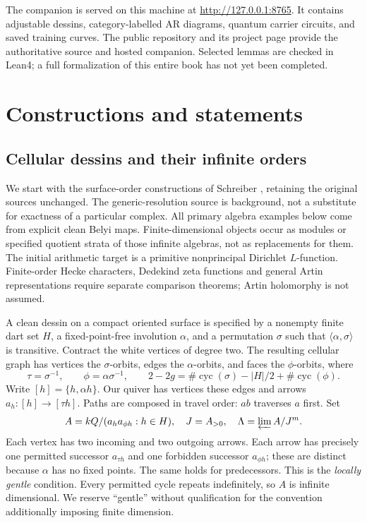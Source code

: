 \documentclass[11pt,oneside,openany]{book}
\theoremstyle{definition}\newtheorem{definition}[theorem]{Definition}
\theoremstyle{remark}\newtheorem{remark}[theorem]{Remark}
\begin{document}
The companion is served on this machine at \url{http://127.0.0.1:8765}. It contains adjustable dessins, category-labelled AR diagrams, quantum carrier circuits, and saved training curves. The public repository and its project page provide the authoritative source and hosted companion. Selected lemmas are checked in Lean4; a full formalization of this entire book has not yet been completed.
{\small\let\savedaddvspace\addvspace\renewcommand{\addvspace}[1]{\savedaddvspace{.6em}}\tableofcontents}
\mainmatter

\part{Constructions and statements}

\chapter{Cellular dessins and their infinite orders}
We start with the surface-order constructions of Schreiber \cite{SurfaceOrders,SurfaceDuality}, retaining the original sources unchanged. The generic-resolution source \cite{Persistence} is background, not a substitute for exactness of a particular complex. All primary algebra examples below come from explicit clean Belyi maps. Finite-dimensional objects occur as modules or specified quotient strata of those infinite algebras, not as replacements for them. The initial arithmetic target is a primitive nonprincipal Dirichlet $L$-function. Finite-order Hecke characters, Dedekind zeta functions and general Artin representations require separate comparison theorems; Artin holomorphy is not assumed.

A clean dessin on a compact oriented surface is specified by a nonempty finite dart set $H$, a fixed-point-free involution $\alpha$, and a permutation $\sigma$ such that $\langle\alpha,\sigma\rangle$ is transitive. Contract the white vertices of degree two. The resulting cellular graph has vertices the $\sigma$-orbits, edges the $\alpha$-orbits, and faces the $\phi$-orbits, where
\[
 \tau=\sigma^{-1},\qquad \phi=\alpha\sigma^{-1},\qquad
 2-2g=\#\operatorname{cyc}(\sigma)-|H|/2+\#\operatorname{cyc}(\phi).
\]
Write $[h]=\{h,\alpha h\}$. Our quiver has vertices these edges and arrows $a_h:[h]\to[\tau h]$. Paths are composed in travel order: $ab$ traverses $a$ first. Set
\[
 A=kQ/(a_h a_{\phi h}:h\in H),\quad J=A_{>0},\quad
 \Lambda=\varprojlim A/J^m.
\]
Each vertex has two incoming and two outgoing arrows. Each arrow has precisely one permitted successor $a_{\tau h}$ and one forbidden successor $a_{\phi h}$; these are distinct because $\alpha$ has no fixed points. The same holds for predecessors. This is the \emph{locally gentle} condition. Every permitted cycle repeats indefinitely, so $A$ is infinite dimensional. We reserve ``gentle'' without qualification for the convention additionally imposing finite dimension.
\end{document}
